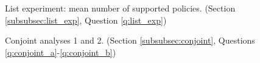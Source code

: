 \begin{figure}[h!]
    \caption[List experiment]{List experiment: mean number of supported policies. (Section \ref{subsubsec:list_exp}, Question \ref{q:list_exp})}\label{fig:list_exp}
\end{figure}

\begin{figure}[h!]
    \caption[Conjoint analyses 1 and 2]{Conjoint analyses 1 and 2. (Section \ref{subsubsec:conjoint}, Questions \ref{q:conjoint_a}-\ref{q:conjoint_b})}\label{fig:conjoint}
\end{figure}



